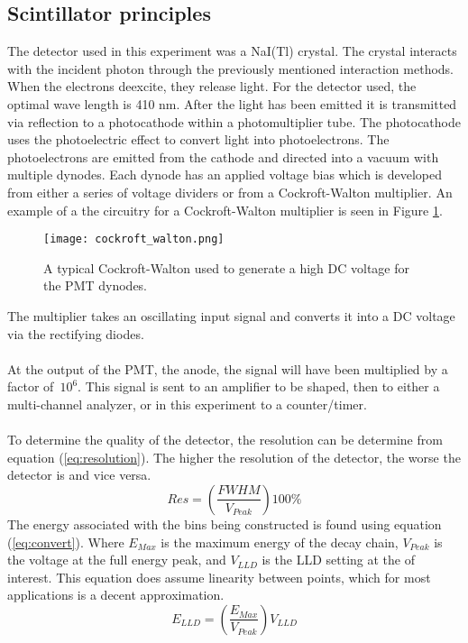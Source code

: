 \documentclass[..Spectroscopy.tex]{subfiles}
\begin{document}
\subsection{Scintillator principles}
	The detector used in this experiment was a NaI(Tl) crystal. The crystal interacts with the incident photon through the previously mentioned interaction methods. When the electrons deexcite, they release light. For the detector used, the optimal wave length is 410 nm.\cite{mcgregor} After the light has been emitted it is transmitted via reflection to a photocathode within a photomultiplier tube. The photocathode uses the photoelectric effect to convert light into photoelectrons. The photoelectrons are emitted from the cathode and directed into a vacuum with multiple dynodes.\cite{mcgregor} Each dynode has an applied voltage bias which is developed from either a series of voltage dividers or from a Cockroft-Walton multiplier. An example of a the circuitry for a Cockroft-Walton multiplier is seen in Figure \ref{fig:cw_multiplier}. 
	\begin{figure}[h!]
		\centering
		\texttt{[image: cockroft\_walton.png]}
		\caption{A typical Cockroft-Walton used to generate a high DC voltage for the PMT dynodes. \cite{WinNT}}
		\label{fig:cw_multiplier}
	\end{figure}
The multiplier takes an oscillating input signal and converts it into a DC voltage via the rectifying diodes. \\ \\
\noindent
At the output of the PMT, the anode, the signal will have been multiplied by a factor of~$10^6$.\cite{mcgregor} This signal is sent to an amplifier to be shaped, then to either a multi-channel analyzer, or in this experiment to a counter/timer. \\ \\
\noindent
	To determine the quality of the detector, the resolution can be determine from equation (\ref{eq:resolution}). The higher the resolution of the detector, the worse the detector is and vice versa.\cite{mcgregor}
		\begin{equation}
			Res=\left(\frac{FWHM}{V_{Peak}}\right)100\%
			\label{eq:resolution}
		\end{equation}
The energy associated with the bins being constructed is found using equation (\ref{eq:convert}). Where $E_{Max}$ is the maximum energy of the decay chain, $V_{Peak}$ is the voltage at the full energy peak, and $V_{LLD}$ is the LLD setting at the of interest. This equation does assume linearity between points, which for most applications is a decent approximation.
	\begin{equation}
		E_{LLD}=\left(\frac{E_{Max}}{V_{Peak}}\right)V_{LLD}
		\label{eq:convert}
	\end{equation}
		 
\end{document}
